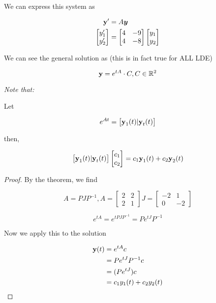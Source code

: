 	\begin{sol}
		We can express this system as

		\begin{align*}
			\bm{\mathrm{y}}' &= A \bm{y}\\
			\begin{bmatrix}
				y_1'\\y_2'
			\end{bmatrix} &= \begin{bmatrix}
				4&-9\\4&-8
			\end{bmatrix} \begin{bmatrix}
				y_1 \\ y_2
			\end{bmatrix}
		\end{align*}

		We can see the general solution as (this is in fact true for ALL LDE)

		\[\bm{\mathrm{y}} = e^{tA} \cdot C, C \in \mathbb{R}^2\]

		\textit{Note that:}
		
		Let

		\[e^{At} = \begin{bmatrix}
			\bm{\mathrm{y}}_1(t) \vert \bm{\mathrm{y}}_t(t)
		\end{bmatrix}\]

		then,

		\[\begin{bmatrix}
			\bm{\mathrm{y}}_1(t) \vert \bm{\mathrm{y}}_t(t)
		\end{bmatrix} \begin{bmatrix}
			c_1\\c_2
		\end{bmatrix} = c_1 \bm{\mathrm{y}}_1(t) +  c_2 \bm{\mathrm{y}}_2(t)\]

		\begin{proof}
			By the theorem, we find

			\[A = PJP^{-1}, A = \begin{bmatrix}
				2&2\\2&1
			\end{bmatrix} J = \begin{bmatrix}
				-2&1\\0&-2
			\end{bmatrix}\]


			\[e^{tA} = e^{tPJP^{-1}} = P e^{tJ} P^{-1}\]


			Now we apply this to the solution

			\begin{align}
				\bm{\mathrm{y}}(t) &= e^{tA} c\\
				&= P e^{tJ} P^{-1} c\\
				&= (P e^{tJ}) c\\
				&= c_1 y_1(t) + c_2 y_2(t)
			\end{align}
		\end{proof}
	\end{sol}

